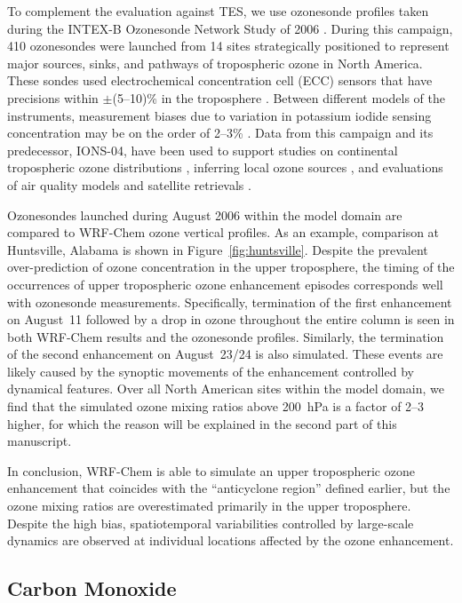To complement the evaluation against TES, we use ozonesonde
profiles taken during the INTEX-B Ozonesonde Network Study of 2006
\citep[IONS-06;][]{Thompson:2008rp}. During this campaign, 410 ozonesondes were
launched from 14 sites strategically positioned to represent major sources, sinks, and
pathways of tropospheric ozone in North America. These sondes used electrochemical
concentration cell (ECC) sensors that have precisions within $\pm$(5--10)\% in the
troposphere \citep{Smit:2007ta}. Between different models of the instruments,
measurement biases due to variation in potassium iodide sensing concentration may be
on the order of 2--3\% \citep{Smit:2007ta}. Data from this campaign and its predecessor,
IONS-04, have been used to support studies on continental tropospheric ozone
distributions \citep[e.g.][]{Cooper:2007cr}, inferring local ozone sources
\citep[e.g.][]{Thompson:2008rp}, and evaluations of air quality models
\citep[e.g.][]{Tarasick:2007dq} and satellite retrievals \citep[e.g.][]{Nassar:2008mw}.

Ozonesondes launched during August 2006 within the model domain are compared
to WRF-Chem ozone vertical profiles. As an example, comparison at Huntsville, Alabama
is shown in Figure~\ref{fig:huntsville}. Despite the prevalent over-prediction of ozone
concentration in the upper troposphere, the timing of the occurrences of upper
tropospheric ozone enhancement episodes corresponds well with ozonesonde
measurements. Specifically, termination of the first enhancement on August~11
followed by a drop in ozone throughout the entire column is seen in both WRF-Chem
results and the ozonesonde profiles. Similarly, the termination of the second
enhancement on August~23/24  is also simulated. These events are likely caused by
the synoptic movements of the enhancement controlled by dynamical features. Over
all North American sites within the model domain, we find that the simulated ozone
mixing ratios above 200~hPa is a factor of 2--3 higher, for which the reason will
be explained in the second part of this manuscript.

In conclusion, WRF-Chem is able to simulate an upper tropospheric ozone enhancement
that coincides with the ``anticyclone region'' defined earlier, but the ozone mixing ratios
are overestimated primarily in the upper troposphere. Despite the high bias,
spatiotemporal variabilities controlled by large-scale dynamics are observed at individual
locations affected by the ozone enhancement.

\subsection{Carbon Monoxide}\label{sect:val/co}

